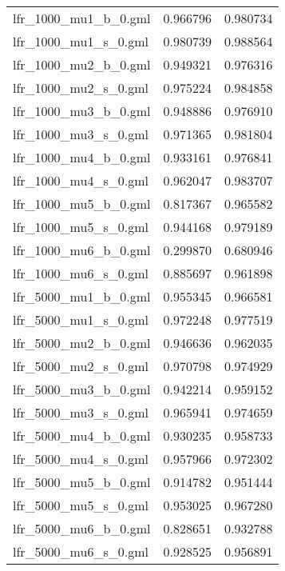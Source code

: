 \begin{center}
\begin{longtable}{|l|l|l|}
		\hline \hline
		\endlastfoot
	lfr\_1000\_mu1\_b\_0.gml &                      0.966796 &                    0.980734 \\
	lfr\_1000\_mu1\_s\_0.gml &                      0.980739 &                    0.988564 \\
	lfr\_1000\_mu2\_b\_0.gml &                      0.949321 &                    0.976316 \\
	lfr\_1000\_mu2\_s\_0.gml &                      0.975224 &                    0.984858 \\
	lfr\_1000\_mu3\_b\_0.gml &                      0.948886 &                    0.976910 \\
	lfr\_1000\_mu3\_s\_0.gml &                      0.971365 &                    0.981804 \\
	lfr\_1000\_mu4\_b\_0.gml &                      0.933161 &                    0.976841 \\
	lfr\_1000\_mu4\_s\_0.gml &                      0.962047 &                    0.983707 \\
	lfr\_1000\_mu5\_b\_0.gml &                      0.817367 &                    0.965582 \\
	lfr\_1000\_mu5\_s\_0.gml &                      0.944168 &                    0.979189 \\
	lfr\_1000\_mu6\_b\_0.gml &                      0.299870 &                    0.680946 \\
	lfr\_1000\_mu6\_s\_0.gml &                      0.885697 &                    0.961898 \\
	lfr\_5000\_mu1\_b\_0.gml &                      0.955345 &                    0.966581 \\
	lfr\_5000\_mu1\_s\_0.gml &                      0.972248 &                    0.977519 \\
	lfr\_5000\_mu2\_b\_0.gml &                      0.946636 &                    0.962035 \\
	lfr\_5000\_mu2\_s\_0.gml &                      0.970798 &                    0.974929 \\
	lfr\_5000\_mu3\_b\_0.gml &                      0.942214 &                    0.959152 \\
	lfr\_5000\_mu3\_s\_0.gml &                      0.965941 &                    0.974659 \\
	lfr\_5000\_mu4\_b\_0.gml &                      0.930235 &                    0.958733 \\
	lfr\_5000\_mu4\_s\_0.gml &                      0.957966 &                    0.972302 \\
	lfr\_5000\_mu5\_b\_0.gml &                      0.914782 &                    0.951444 \\
	lfr\_5000\_mu5\_s\_0.gml &                      0.953025 &                    0.967280 \\
	lfr\_5000\_mu6\_b\_0.gml &                      0.828651 &                    0.932788 \\
	lfr\_5000\_mu6\_s\_0.gml &                      0.928525 &                    0.956891 

	\end{longtable}
\end{center}


